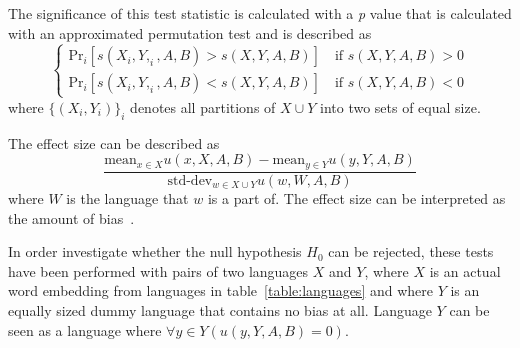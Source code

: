 The significance of this test statistic is calculated with a \emph{p} value that is
calculated with an approximated permutation test and is described as
$$
\begin{cases}
    \text{Pr}_i[s(X_i, Y,_i, A, B) > s(X,Y,A,B)] \quad \text{if } s(X,Y,A,B) > 0 \\
    \text{Pr}_i[s(X_i, Y,_i, A, B) < s(X,Y,A,B)] \quad \text{if } s(X,Y,A,B) < 0
\end{cases}
$$
where $\{(X_i, Y_i)\}_i$ denotes all partitions of $X \cup Y$ into two sets of equal 
size. 

The effect size can be described as
$$
\frac{
    \text{mean}_{x \in X} u(x, X, A, B) - \text{mean}_{y \in Y} u(y, Y, A, B)
}{
    \text{std-dev}_{w \in X \cup Y} u(w,W,A,B)
}
$$
where $W$ is the language that $w$ is a part of. The effect size can be interpreted as
the amount of bias~\parencite{lauscher-glavas-2019-consistently}.

In order investigate whether the null hypothesis $H_0$ can be rejected, these tests have
been performed with pairs of two languages $X$ and $Y$, where $X$ is an actual word
embedding
from languages in table~\ref{table:languages} and where $Y$ is an equally sized dummy
language that
contains no bias at all. Language $Y$ can be seen as a language where
$\forall y \in Y(u(y,Y,A,B) = 0)$.

